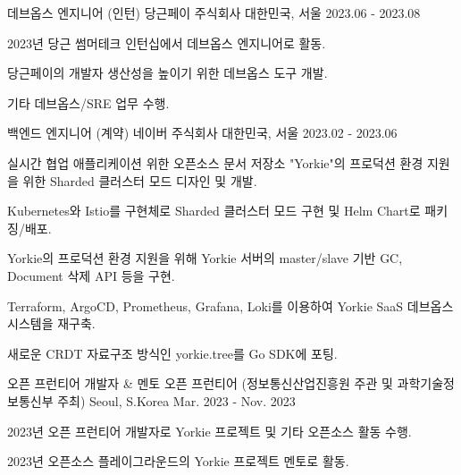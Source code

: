 

\begin{cventries}

  \cventry
    {데브옵스 엔지니어 (인턴)} %
    {당근페이 주식회사} %
    {대한민국, 서울} %
    {2023.06 - 2023.08} %
    {
      \begin{cvitems} %
        \item {2023년 당근 썸머테크 인턴십에서 데브옵스 엔지니어로 활동.}
        \item {당근페이의 개발자 생산성을 높이기 위한 데브옵스 도구 개발.}
        \item {기타 데브옵스/SRE 업무 수행.}
      \end{cvitems}
    }

  \cventry
    {백엔드 엔지니어 (계약)} %
    {네이버 주식회사} %
    {대한민국, 서울} %
    {2023.02 - 2023.06} %
    {
      \begin{cvitems} %
        \item {실시간 협업 애플리케이션 위한 오픈소스 문서 저장소 "Yorkie"의 프로덕션 환경 지원을 위한 Sharded 클러스터 모드 디자인 및 개발.}
        \item {Kubernetes와 Istio를 구현체로 Sharded 클러스터 모드 구현 및 Helm Chart로 패키징/배포.}
        \item {Yorkie의 프로덕션 환경 지원을 위해 Yorkie 서버의 master/slave 기반 GC, Document 삭제 API 등을 구현.}        
        \item {Terraform, ArgoCD, Prometheus, Grafana, Loki를 이용하여 Yorkie SaaS 데브옵스 시스템을 재구축.}
        \item {새로운 CRDT 자료구조 방식인 yorkie.tree를 Go SDK에 포팅.}
      \end{cvitems}
    }

  \cventry
    {오픈 프런티어 개발자 \& 멘토} %
    {오픈 프런티어 (정보통신산업진흥원 주관 및 과학기술정보통신부 주최)} %
    {Seoul, S.Korea} %
    {Mar. 2023 - Nov. 2023} %
    {
      \begin{cvitems} %
        \item {2023년 오픈 프런티어 개발자로 Yorkie 프로젝트 및 기타 오픈소스 활동 수행.}
        \item {2023년 오픈소스 플레이그라운드의 Yorkie 프로젝트 멘토로 활동.}
      \end{cvitems}
    }


\end{cventries}
